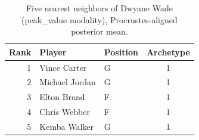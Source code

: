 \begin{table}[htbp]
  \centering\small
  \begin{tabular}{rllc}
    \toprule
    Rank & Player & Position & Archetype \\
    \midrule
    1 & Vince Carter & G & 1 \\
    2 & Michael Jordan & G & 1 \\
    3 & Elton Brand & F & 1 \\
    4 & Chris Webber & F & 1 \\
    5 & Kemba Walker & G & 1 \\
    \bottomrule
  \end{tabular}
  \caption{Five nearest neighbors of Dwyane Wade (peak_value modality), Procrustes-aligned posterior mean.}
  \label{tab:Dwyane_Wade_neighbors_peak_value}
\end{table}

